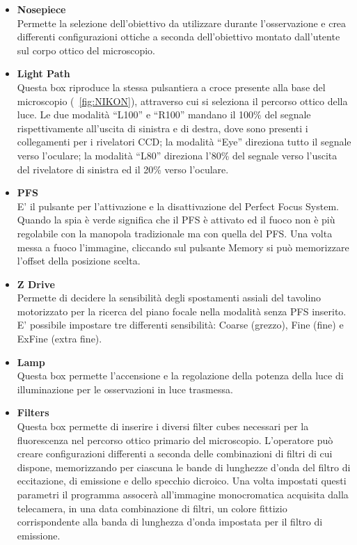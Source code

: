 \begin{itemize}
\item \textbf{Nosepiece}\\
Permette la selezione dell'obiettivo da utilizzare durante l'osservazione e crea differenti configurazioni ottiche a seconda dell'obiettivo montato dall'utente sul corpo ottico del microscopio.

\item \textbf{Light Path}\\
Questa box riproduce la stessa pulsantiera a croce presente alla base del microscopio (\figurename~\ref{fig:NIKON}), attraverso cui si seleziona il percorso ottico della luce. 
Le due modalità ``L100'' e ``R100'' mandano il 100\% del segnale rispettivamente all'uscita di sinistra e di destra, dove sono presenti i collegamenti per i rivelatori CCD; la modalità ``Eye'' direziona tutto il segnale verso l'oculare; la modalità ``L80'' direziona l'80\% del segnale verso l'uscita del rivelatore di sinistra ed il 20\% verso l'oculare.

\item \textbf{PFS}\\
E' il pulsante per l'attivazione e la disattivazione del Perfect Focus System. 
Quando la spia è verde significa che il PFS è attivato ed il fuoco non è più regolabile con la manopola tradizionale ma con quella del PFS. 
Una volta messa a fuoco l'immagine, cliccando sul pulsante Memory si può memorizzare l'offset della posizione scelta.

\item \textbf{Z Drive}\\
Permette di decidere la sensibilità degli spostamenti assiali del tavolino motorizzato per la ricerca del piano focale nella modalità senza PFS inserito.
E' possibile impostare tre differenti sensibilità: Coarse (grezzo), Fine (fine) e ExFine (extra fine).

\item \textbf{Lamp}\\
Questa box permette l'accensione e la regolazione della potenza della luce di illuminazione per le osservazioni in luce trasmessa.

\item \textbf{Filters}\\
Questa box permette di inserire i diversi filter cubes necessari per la fluorescenza nel percorso ottico primario del microscopio.
L'operatore può creare configurazioni differenti a seconda delle combinazioni di filtri di cui dispone, memorizzando per ciascuna le bande di lunghezze d'onda del filtro di eccitazione, di emissione e dello specchio dicroico.
Una volta impostati questi parametri il programma assocerà all'immagine monocromatica acquisita dalla telecamera, in una data combinazione di filtri, un colore fittizio corrispondente alla banda di lunghezza d'onda impostata per il filtro di emissione.
\end{itemize}

